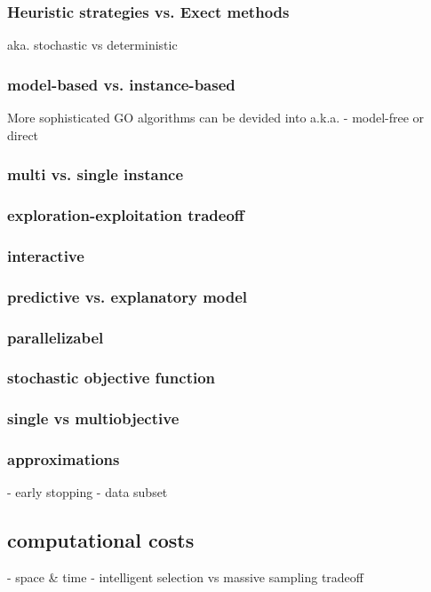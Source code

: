 \documentclass[english]{article}
\begin{document}
\subsubsection*{Heuristic strategies vs. Exect methods}
aka. stochastic vs deterministic

\subsubsection*{model-based vs. instance-based}
More sophisticated \ac{GO} algorithms can be devided into
a.k.a. - model-free or direct

\subsubsection*{multi vs. single instance}

\subsubsection*{exploration-exploitation tradeoff}

\subsubsection*{interactive}

\subsubsection*{predictive vs. explanatory model}

\subsubsection*{parallelizabel}

\subsubsection*{stochastic objective function}

\subsubsection*{single vs multiobjective}

\subsubsection*{approximations}
 - early stopping
 - data subset

 \subsection{computational costs}
 - space \& time
 - intelligent selection vs massive sampling tradeoff
\end{document}
